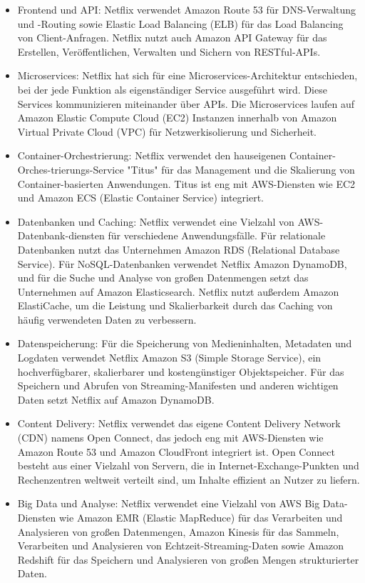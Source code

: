 \begin{itemize}
\item Frontend und API: Netflix verwendet Amazon Route 53 für DNS-Verwaltung und -Routing sowie Elastic Load Balancing (ELB) für das Load Balancing von Client-Anfragen. Netflix nutzt auch Amazon API Gateway für das Erstellen, Veröffentlichen, Verwalten und Sichern von RESTful-APIs.
\item Microservices: Netflix hat sich für eine Microservices-Architektur entschieden, bei der jede Funktion als eigenständiger Service ausgeführt wird. Diese Services kommunizieren miteinander über APIs. Die Microservices laufen auf Amazon Elastic Compute Cloud (EC2) Instanzen innerhalb von Amazon Virtual Private Cloud (VPC) für Netzwerkisolierung und Sicherheit.
\item Container-Orchestrierung: Netflix verwendet den hauseigenen Container-Orches-trierungs-Service "Titus" für das Management und die Skalierung von Container-basierten Anwendungen. Titus ist eng mit AWS-Diensten wie EC2 und Amazon ECS (Elastic Container Service) integriert.
\item Datenbanken und Caching: Netflix verwendet eine Vielzahl von AWS-Datenbank-diensten für verschiedene Anwendungsfälle. Für relationale Datenbanken nutzt das Unternehmen Amazon RDS (Relational Database Service). Für NoSQL-Datenbanken verwendet Netflix Amazon DynamoDB, und für die Suche und Analyse von großen Datenmengen setzt das Unternehmen auf Amazon Elasticsearch. Netflix nutzt außerdem Amazon ElastiCache, um die Leistung und Skalierbarkeit durch das Caching von häufig verwendeten Daten zu verbessern.
\item Datenspeicherung: Für die Speicherung von Medieninhalten, Metadaten und Logdaten verwendet Netflix Amazon S3 (Simple Storage Service), ein hochverfügbarer, skalierbarer und kostengünstiger Objektspeicher. Für das Speichern und Abrufen von Streaming-Manifesten und anderen wichtigen Daten setzt Netflix auf Amazon DynamoDB.
\item Content Delivery: Netflix verwendet das eigene Content Delivery Network (CDN) namens Open Connect, das jedoch eng mit AWS-Diensten wie Amazon Route 53 und Amazon CloudFront integriert ist. Open Connect besteht aus einer Vielzahl von Servern, die in Internet-Exchange-Punkten und Rechenzentren weltweit verteilt sind, um Inhalte effizient an Nutzer zu liefern.
\item Big Data und Analyse: Netflix verwendet eine Vielzahl von AWS Big Data-Diensten wie Amazon EMR (Elastic MapReduce) für das Verarbeiten und Analysieren von großen Datenmengen, Amazon Kinesis für das Sammeln, Verarbeiten und Analysieren von Echtzeit-Streaming-Daten sowie Amazon Redshift für das Speichern und Analysieren von großen Mengen strukturierter Daten.

\end{itemize}
